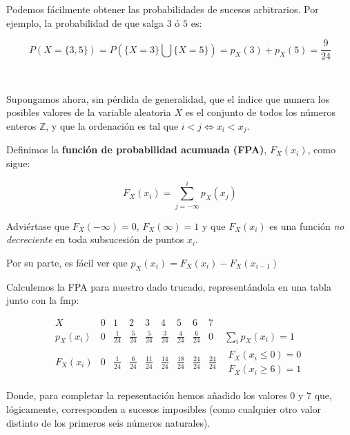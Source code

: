 \documentclass[11pt]{article}
\begin{document}
Podemos fácilmente obtener las probabilidades de sucesos arbitrarios.
Por ejemplo, la probabilidad de que salga \(3\) ó \(5\) es:

\[
P(X=\{3,5\})=P(\{X=3\}\bigcup \{X=5\}) = p_X(3)+p_X(5)=\frac{9}{24}
\]

    \begin{center}
    \end{center}
    { \hspace*{\fill} \\}
    
    Supongamos ahora, sin pérdida de generalidad, que el índice que numera
los posibles valores de la variable aleatoria \(X\) es el conjunto de
todos los números enteros \(\mathbb{Z}\), y que la ordenación es tal que
\(i<j \iff x_i < x_j\).

Definimos la \textbf{función de probabilidad acumuada (FPA)},
\(F_X(x_i)\), como sigue:

\[F_X(x_i)=\sum_{j=-\infty}^{i}p_X(x_j)\]

Adviértase que \(F_X(-\infty)=0\), \(F_X(\infty)=1\) y que \(F_X(x_i)\)
es una función \emph{no decreciente} en toda subsucesión de puntos
\(x_i\).

Por su parte, es fácil ver que \(p_X(x_i)=F_X(x_i)-F_X(x_{i-1})\)

    Calculemos la FPA para nuestro dado trucado, representándola en una
tabla junto con la fmp:

\[
\begin{array}{c|cccccccc|c}
  X & 0 & 1 & 2 & 3 & 4 & 5 & 6 & 7 & \\ 
  \hline
  p_X(x_i) & 0 & \frac{1}{24} & \frac{5}{24} & \frac{5}{24} & \frac{3}{24} & \frac{4}{24} & \frac{6}{24} & 0 & \sum_i p_X(x_i)=1 \\
  \hline
  F_X(x_i) & 0 & \frac{1}{24} & \frac{6}{24} & \frac{11}{24} & \frac{14}{24} & \frac{18}{24} & \frac{24}{24} & \frac{24}{24} & \begin{matrix}  
  F_X(x_i\leq 0)=0\\
  F_X(x_i\geq 6)=1 
 \end{matrix}
 \end{array}
\]

Donde, para completar la repesentación hemos añadido los valores \(0\) y
\(7\) que, lógicamente, corresponden a sucesos imposibles (como
cualquier otro valor distinto de los primeros seis números naturales).
\end{document}
